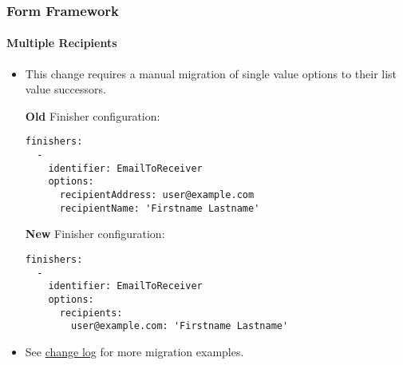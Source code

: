 
\begin{frame}[fragile]
\frametitle{Form Framework}
\framesubtitle{Multiple Recipients}

	\lstset{basicstyle=\tiny\ttfamily}

	\begin{itemize}
		\item This change requires a manual migration of single value options to their list value successors.

		\smaller\textbf{Old} Finisher configuration:\normalsize
\begin{lstlisting}
finishers:
  -
    identifier: EmailToReceiver
    options:
      recipientAddress: user@example.com
      recipientName: 'Firstname Lastname'
\end{lstlisting}

		\smaller\textbf{New} Finisher configuration:\normalsize
\begin{lstlisting}
finishers:
  -
    identifier: EmailToReceiver
    options:
      recipients:
        user@example.com: 'Firstname Lastname'
\end{lstlisting}

		\item See \href{https://docs.typo3.org/c/typo3/cms-core/10.0/en-us/Changelog/master/Deprecation-80420-EmailFinisherSingleAddressOptions.html}{change log}
			for more migration examples.

	\end{itemize}

\end{frame}


